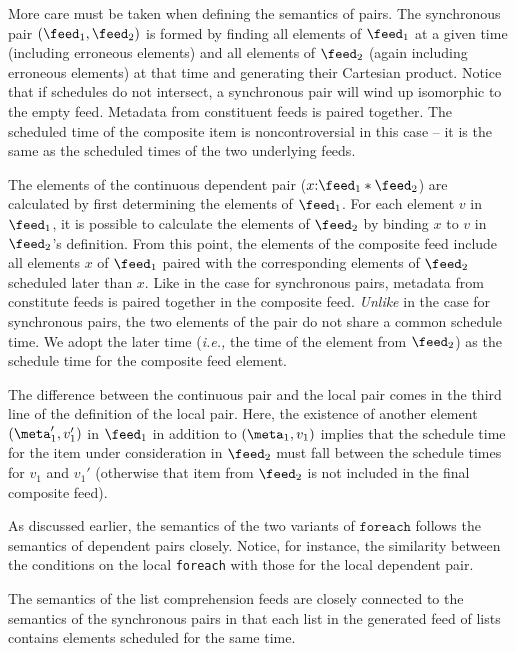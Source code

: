 More care must be taken when defining the semantics of pairs.
The synchronous pair $(\feed_1,\feed_2)$
is formed by finding all elements of $\feed_1$
at a given time (including erroneous elements) 
and all elements of  $\feed_2$ (again including erroneous elements) 
at that time and
generating their Cartesian product.  Notice that if schedules 
do not intersect, a synchronous pair will wind up isomorphic to the
empty feed.  Metadata from constituent feeds is paired together.
The scheduled time of the composite item is noncontroversial in this case --
it is the same as the scheduled times of the two underlying feeds.

The elements of the continuous dependent pair ($x{:}\feed_1 * \feed_2$)
are calculated by first determining the elements of $\feed_1$. 
For each element $v$ in $\feed_1$, it is possible to calculate
the elements of $\feed_2$ by binding $x$ to $v$ in $\feed_2$'s definition.
From this point, the elements of the composite feed include all elements
$x$ of $\feed_1$ paired with the corresponding elements of $\feed_2$ scheduled
later than $x$.  Like in the case for synchronous pairs, metadata from 
constitute feeds is paired together in the composite feed.  {\em Unlike}
in the case for synchronous pairs, the two elements of the pair do
not share a common schedule time.  We adopt the later time ({\em i.e.,}
the time of the element from $\feed_2$) as the schedule time for the
composite feed element.

The difference between the continuous pair and the local pair
comes in the third line of the definition of the local pair.
Here, the existence of another element $(\meta_1',v_1')$
in $\feed_1$ in addition to $(\meta_1,v_1)$ implies that the 
schedule time for the item under consideration in $\feed_2$
must fall between the schedule times for $v_1$ and $v_1'$
(otherwise that item from $\feed_2$ is not included in the
final composite feed). 

As discussed earlier, the semantics of the two variants of $\mathtt{foreach}$
follows the semantics of dependent pairs closely.  Notice, for instance,
the similarity between the conditions on the local {\tt foreach} with those
for the local dependent pair.  

The semantics of the list comprehension feeds are closely connected to the semantics of
the synchronous pairs in that each list in the generated feed of lists contains elements
scheduled for the same time.

